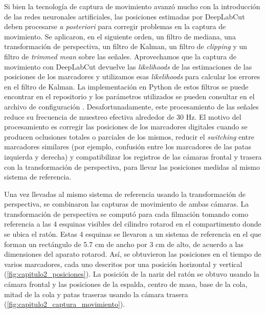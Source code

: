 Si bien la tecnología de captura de movimiento avanzó mucho con la introducción de las redes neuronales artificiales, las posiciones estimadas por DeepLabCut deben procesarse \textit{a posteriori} para corregir problemas en la captura de movimiento. Se aplicaron, en el siguiente orden, un filtro de mediana, una transformación de perspectiva, un filtro de Kalman, un filtro de \textit{clipping} y un filtro de \textit{trimmed mean} sobre las señales. Aprovechamos que la captura de movimiento con DeepLabCut devuelve las \textit{likelihoods} de las estimaciones de las posiciones de los marcadores y utilizamos esas \textit{likelihoods} para calcular los errores en el filtro de Kalman. La implementación en Python de estos filtros se puede encontrar en el repositorio \href{https://github.com/alvaro-concha/animal-behavior-preprocessing}{\color{blue}{animal-behavior-preprocessing}} y los parámetros utilizados se pueden consultar en el archivo de configuración \href{https://github.com/alvaro-concha/animal-behavior-preprocessing/blob/main/animal_behavior_preprocessing/config.py}{}. Desafortunadamente, este procesamiento de las señales reduce su frecuencia de muestreo efectiva alrededor de 30 Hz. El motivo del procesamiento es corregir las posiciones de los marcadores digitales cuando se producen oclusiones totales o parciales de los mismos, reducir el \textit{switching} entre marcadores similares (por ejemplo, confusión entre los marcadores de las patas izquierda y derecha) y compatibilizar los registros de las cámaras frontal y trasera con la transformación de perspectiva, para llevar las posiciones medidas al mismo sistema de referencia.

Una vez llevadas al mismo sistema de referencia usando la transformación de perspectiva, se combinaron las capturas de movimiento de ambas cámaras. La transformación de perspectiva se computó para cada filmación tomando como referencia a las 4 esquinas visibles del cilindro rotarod en el compartimento donde se ubica el ratón. Estas 4 esquinas se llevaron a un sistema de referencia en el que forman un rectángulo de 5.7 cm de ancho por 3 cm de alto, de acuerdo a las dimensiones del aparato rotarod. Así, se obtuvieron las posiciones en el tiempo de varios marcadores, cada uno descritos por una posición horizontal y vertical (\autoref{fig:capitulo2_posiciones}). La posición de la nariz del ratón se obtuvo usando la cámara frontal y las posiciones de la espalda, centro de masa, base de la cola, mitad de la cola y patas traseras usando la cámara trasera (\autoref{fig:capitulo2_captura_movimiento}).

